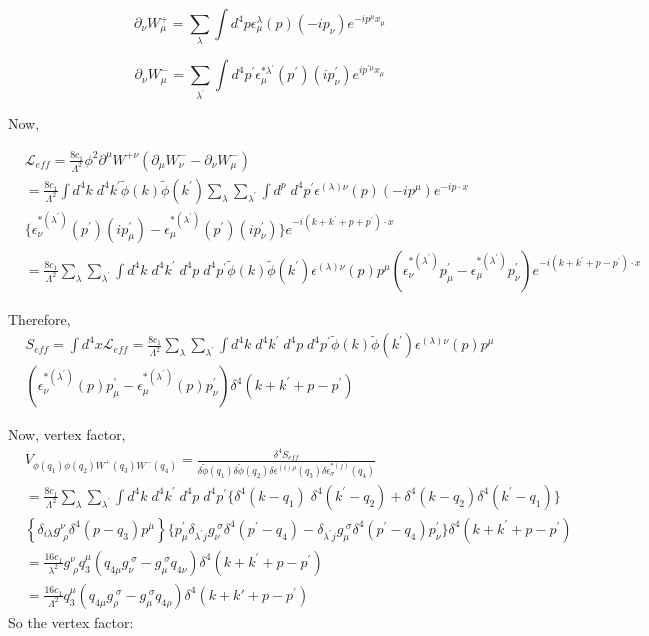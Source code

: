 \documentclass[12pt]{report}
\begin{document}
$$\partial_\nu W_\mu^+ = \sum_\lambda \int d^4p \epsilon^\lambda_\mu(p) (-ip_\nu) e^{-i p^\mu x_\mu}$$

$$\partial_\nu W_\mu^- = \sum_{\lambda^\prime} \int d^4p^\prime \epsilon^{*\lambda^\prime}_\mu(p^\prime) (ip^\prime_\nu) e^{i p^{\prime \mu} x_\mu}$$

Now,

\begin{align*}
& \mathscr{L}_{eff} = \frac{8c_1}{\Lambda^2} \phi^2 \partial^\mu W^{+ \nu} (\partial_\mu W^-_\nu- \partial_\nu W^-_\mu)\\
&= \frac{8c_1}{\Lambda^2} \int d^4k\; d^4k^\prime \tilde{\phi}(k) \tilde{\phi}(k^\prime) \sum_\lambda \sum_{\lambda^\prime} \int d^p\; d^4p^\prime \epsilon^{(\lambda) \nu}(p) (-i p^\mu) e^{-i p \cdot x} \\
& \{\epsilon^{*(\lambda^\prime)}_\nu(p^\prime) (ip^\prime_\mu)-\epsilon^{*(\lambda^\prime)}_\mu(p^\prime) (ip^\prime_\nu) \}e^{-i(k+k^\prime+p+p^\prime)\cdot x}\\
& = \frac{8c_1}{\Lambda^2} \sum_\lambda \sum_{\lambda^\prime} \int d^4k\;d^4k^\prime\;d^4p\;d^4p^\prime \tilde{\phi}(k) \tilde{\phi}(k^\prime) \epsilon^{(\lambda) \nu}(p) p^\mu (\epsilon^{*(\lambda^\prime)}_\nu p^\prime_\mu- \epsilon^{*(\lambda^\prime)}_\mu p^\prime_\nu) e^{-i(k+k^\prime+p-p^\prime)\cdot x}
\end{align*}
 
 
 
Therefore, 
\begin{multline*}
S_{eff}=\int d^4x \mathscr{L}_{eff}= \frac{8c_1}{\Lambda^2} \sum_\lambda \sum_{\lambda^\prime} \int d^4k\; d^4k^\prime\; d^4p\; d^4p^\prime \tilde{\phi}(k) \tilde{\phi}(k^\prime) \epsilon^{(\lambda) \nu}(p) p^\mu \\
 \left(\epsilon^{*(\lambda^\prime)}_\nu (p) p_\mu^\prime -\epsilon^{*(\lambda^\prime)}_\mu (p) p_\nu^\prime\right) \delta^4(k+k^\prime +p-p^\prime)
\end{multline*}

Now, vertex factor,
\begin{align*}
& V_{\phi(q_1) \phi(q_2) W^+(q_3) W^-(q_4)}=\frac{\delta^4 S_{eff}}{\delta \tilde{\phi}(q_1) \delta \tilde{\phi}(q_2) \delta\epsilon^{(i) \rho}(q_3) \delta \epsilon^{*(j)}_\sigma(q_4)} \\
&= \frac{8 c_1}{\Lambda^2} \sum_\lambda \sum_{\lambda^\prime} \int d^4k\; d^4k^\prime\; d^4p\; d^4p^\prime \{\delta^4 (k-q_1)\; \delta^4 (k^\prime -q_2) + \delta^4(k-q_2) \delta^4(k^\prime-q_1)\} \\ 
&\left\{\delta_{i \lambda} g^\nu_{\; \rho} \delta^4(p-q_3) p^\mu\right\} \{ p^\prime_\mu \delta_{\lambda^\prime j} g_\nu^{\; \sigma} \delta^4(p^\prime -q_4)- \delta_{\lambda^\prime j} g_\mu^{\; \sigma} \delta^4(p^\prime-q_4)p^\prime_\nu\} \delta^4(k+k^\prime +p -p^\prime)\\
&=\frac{16c_1}{\lambda^2} g^\nu_{\; \rho} q_3^\mu (q_{4 \mu} g_\nu^{\;\sigma} - g^{\; \sigma}_\mu q_{4 \nu}) \delta^4(k+k^\prime+p-p^\prime)\\
&= \frac{16c_1}{\Lambda^2} q_3^\mu (q_{4\mu} g^{\;\sigma}_\rho-g^{\;\sigma}_\mu q_{4 \rho} ) \delta^4(k+k\prime+p-p^\prime)
\end{align*}
 So the vertex factor: 
 
\end{document}
